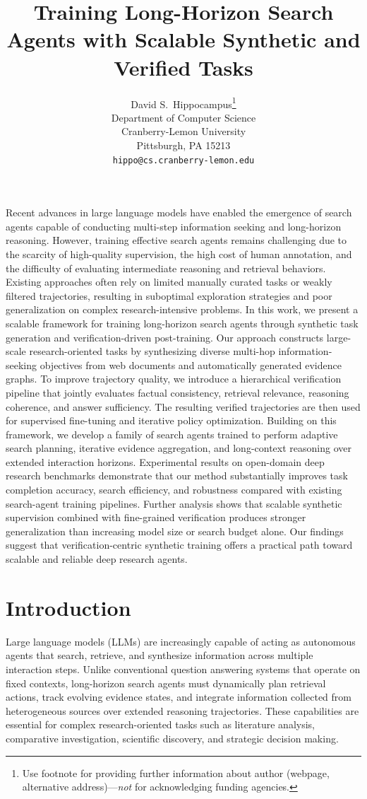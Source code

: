 \documentclass{article}
\title{Training Long-Horizon Search Agents with Scalable Synthetic and Verified Tasks}
\author{%
  David S.~Hippocampus\thanks{Use footnote for providing further information
    about author (webpage, alternative address)---\emph{not} for acknowledging
    funding agencies.} \\
  Department of Computer Science\\
  Cranberry-Lemon University\\
  Pittsburgh, PA 15213 \\
  \texttt{hippo@cs.cranberry-lemon.edu} \\
}
\begin{document}
\maketitle


\begin{myabstract}
Recent advances in large language models have enabled the emergence of search agents capable of conducting multi-step information seeking and long-horizon reasoning. However, training effective search agents remains challenging due to the scarcity of high-quality supervision, the high cost of human annotation, and the difficulty of evaluating intermediate reasoning and retrieval behaviors. Existing approaches often rely on limited manually curated tasks or weakly filtered trajectories, resulting in suboptimal exploration strategies and poor generalization on complex research-intensive problems.
In this work, we present a scalable framework for training long-horizon search agents through synthetic task generation and verification-driven post-training. Our approach constructs large-scale research-oriented tasks by synthesizing diverse multi-hop information-seeking objectives from web documents and automatically generated evidence graphs. To improve trajectory quality, we introduce a hierarchical verification pipeline that jointly evaluates factual consistency, retrieval relevance, reasoning coherence, and answer sufficiency. The resulting verified trajectories are then used for supervised fine-tuning and iterative policy optimization.
Building on this framework, we develop a family of search agents trained to perform adaptive search planning, iterative evidence aggregation, and long-context reasoning over extended interaction horizons. Experimental results on open-domain deep research benchmarks demonstrate that our method substantially improves task completion accuracy, search efficiency, and robustness compared with existing search-agent training pipelines. Further analysis shows that scalable synthetic supervision combined with fine-grained verification produces stronger generalization than increasing model size or search budget alone.
Our findings suggest that verification-centric synthetic training offers a practical path toward scalable and reliable deep research agents.
\end{myabstract}



\section{Introduction}
Large language models (LLMs) are increasingly capable of acting as autonomous agents that search, retrieve, and synthesize information across multiple interaction steps. Unlike conventional question answering systems that operate on fixed contexts, long-horizon search agents must dynamically plan retrieval actions, track evolving evidence states, and integrate information collected from heterogeneous sources over extended reasoning trajectories. These capabilities are essential for complex research-oriented tasks such as literature analysis, comparative investigation, scientific discovery, and strategic decision making.
\end{document}
